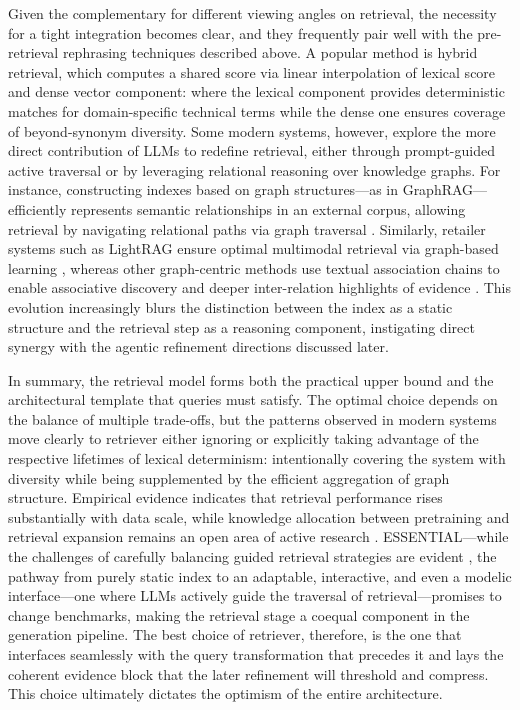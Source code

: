 \documentclass[11pt,a4paper]{article}
\begin{document}
Given the complementary for different viewing angles on retrieval, the necessity for a tight integration becomes clear, and they frequently pair well with the pre-retrieval rephrasing techniques described above. A popular method is hybrid retrieval, which computes a shared score via linear interpolation of lexical score and dense vector component: where the lexical component provides deterministic matches for domain-specific technical terms while the dense one ensures coverage of beyond-synonym diversity. Some modern systems, however, explore the more direct contribution of LLMs to redefine retrieval, either through prompt-guided active traversal or by leveraging relational reasoning over knowledge graphs. For instance, constructing indexes based on graph structures---as in GraphRAG---efficiently represents semantic relationships in an external corpus, allowing retrieval by navigating relational paths via graph traversal \cite{arxiv:2502.14902v2}. Similarly, retailer systems such as LightRAG ensure optimal multimodal retrieval via graph-based learning \cite{arxiv:2410.05779v3}, whereas other graph-centric methods use textual association chains to enable associative discovery and deeper inter-relation highlights of evidence \cite{arxiv:2604.10426v1}. This evolution increasingly blurs the distinction between the index as a static structure and the retrieval step as a reasoning component, instigating direct synergy with the agentic refinement directions discussed later.

In summary, the retrieval model forms both the practical upper bound and the architectural template that queries must satisfy. The optimal choice depends on the balance of multiple trade-offs, but the patterns observed in modern systems move clearly to retriever either ignoring or explicitly taking advantage of the respective lifetimes of lexical determinism: intentionally covering the system with diversity while being supplemented by the efficient aggregation of graph structure. Empirical evidence indicates that retrieval performance rises substantially with data scale, while knowledge allocation between pretraining and retrieval expansion remains an open area of active research \cite{arxiv:2604.00715v1}. ESSENTIAL---while the challenges of carefully balancing guided retrieval strategies are evident \cite{arxiv:2412.15529v4}, the pathway from purely static index to an adaptable, interactive, and even a modelic interface---one where LLMs actively guide the traversal of retrieval---promises to change benchmarks, making the retrieval stage a coequal component in the generation pipeline. The best choice of retriever, therefore, is the one that interfaces seamlessly with the query transformation that precedes it and lays the coherent evidence block that the later refinement will threshold and compress. This choice ultimately dictates the optimism of the entire architecture.
\end{document}
